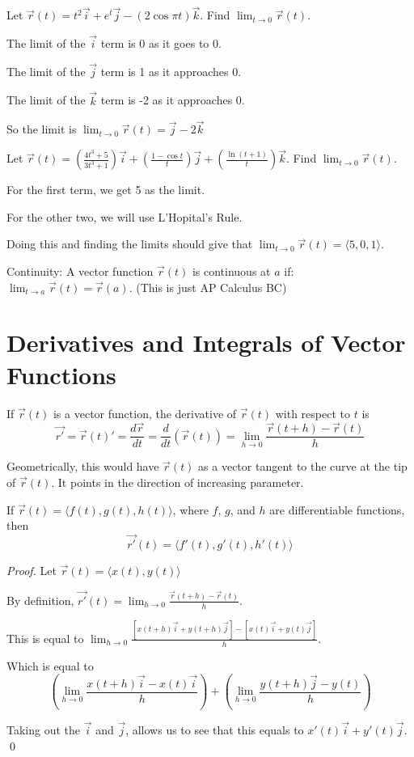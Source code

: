 \documentclass[../calc3.tex]{subfiles}
\begin{document}
\begin{example}
    Let $\vec{r}(t)=t^2\vec{i}+e^t\vec{j}-(2\cos \pi t)\vec{k}$. Find $\lim_{t\to 0}\vec{r}(t)$.

    The limit of the $\vec{i}$ term is 0 as it goes to 0.

    The limit of the $\vec{j}$ term is 1 as it approaches 0.

    The limit of the $\vec{k}$ term is -2 as it approaches 0.

    So the limit is $\lim_{t\to 0} \vec{r}(t) = \vec{j}-2\vec{k}$
\end{example}

\begin{example}
    Let $\vec{r}(t) = \left(\frac{4t^3+5}{3t^3+1}\right)\vec{i}+\left(\frac{1-\cos t}{t}\right)\vec{j}+\left(\frac{\ln(t+1)}{t}\right)\vec{k}$. Find $\lim_{t\to 0}\vec{r}(t)$.

    For the first term, we get 5 as the limit.

    For the other two, we will use L'Hopital's Rule.

    Doing this and finding the limits should give that $\lim_{t\to 0}\vec{r}(t) = \langle 5,0,1\rangle$.
\end{example}

Continuity: A vector function $\vec{r}(t)$ is continuous at $a$ if: $\lim_{t\to a} \vec{r}(t)=\vec{r}(a)$. (This is just AP Calculus BC)

\section{Derivatives and Integrals of Vector Functions}
\begin{definition}
    If $\vec{r}(t)$ is a vector function, the derivative of $\vec{r}(t)$ with respect to $t$ is 
    \[ \vec{r'} = \vec{r}(t)'=\frac{d\vec{r}}{dt}=\frac{d}{dt}(\vec{r}(t)) = \lim_{h\to 0}\frac{\vec{r}(t+h)-\vec{r}(t)}{h} \]
\end{definition}

Geometrically, this would have $\vec{r}(t)$ as a vector tangent to the curve at the tip of $\vec{r}(t)$. It points in the direction of increasing parameter.

\begin{theorem}
    If $\vec{r}(t)=\langle f(t),g(t),h(t)\rangle$, where $f$, $g$, and $h$ are differentiable functions, then 
    \[ \vec{r'}(t)=\langle f'(t),g'(t),h'(t)\rangle \]
\end{theorem}
\begin{proof}
    Let $\vec{r}(t)=\langle x(t),y(t)\rangle$

    By definition, $\vec{r'}(t)=\lim_{h\to 0}\frac{\vec{r}(t+h)-\vec{r}(t)}{h}$.

    This is equal to $\lim_{h\to 0}\frac{[x(t+h)\vec{i}+y(t+h)\vec{j}]-[x(t)\vec{i}+y(t)\vec{j}]}{h}$.

    Which is equal to 
    \[ \left(\lim_{h\to 0}\frac{x(t+h)\vec{i}-x(t)\vec{i}}{h}\right) + \left(\lim_{h\to 0}\frac{y(t+h)\vec{j}-y(t)}{h}\right) \]

    Taking out the $\vec{i}$ and $\vec{j}$, allows us to see that this equals to $x'(t)\vec{i}+y'(t)\vec{j}$. \qed
\end{proof}
\end{document}
